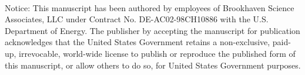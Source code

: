\documentclass[a4paper]{jpconf}
\begin{document}



~

Notice:
This manuscript has been authored by employees of Brookhaven Science Associates,
LLC under Contract No. DE-AC02-98CH10886 with the U.S. Department of Energy.
The publisher by accepting the manuscript for publication acknowledges
that the United States Government retains a non-exclusive, paid-up, irrevocable,
world-wide license to publish or reproduce the published form of this manuscript,
or allow others to do so, for United States Government purposes.
\end{document}
